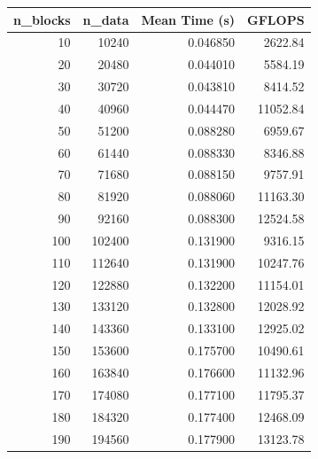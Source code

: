 \begin{table}[H]
    \centering
    \small
    \begin{tabular}{|r|r|r|r|}
        \hline
        n\_blocks    & n\_data         & Mean Time (s)     & GFLOPS            \\
        \hline
        10           & 10240           & 0.046850          & 2622.84           \\
        20           & 20480           & 0.044010          & 5584.19           \\
        30           & 30720           & 0.043810          & 8414.52           \\
        40           & 40960           & 0.044470          & 11052.84          \\
        50           & 51200           & 0.088280          & 6959.67           \\
        60           & 61440           & 0.088330          & 8346.88           \\
        70           & 71680           & 0.088150          & 9757.91           \\
        80           & 81920           & 0.088060          & 11163.30          \\
        90           & 92160           & 0.088300          & 12524.58          \\
        100          & 102400          & 0.131900          & 9316.15           \\
        110          & 112640          & 0.131900          & 10247.76          \\
        120          & 122880          & 0.132200          & 11154.01          \\
        130          & 133120          & 0.132800          & 12028.92          \\
        140          & 143360          & 0.133100          & 12925.02          \\
        150          & 153600          & 0.175700          & 10490.61          \\
        160          & 163840          & 0.176600          & 11132.96          \\
        170          & 174080          & 0.177100          & 11795.37          \\
        180          & 184320          & 0.177400          & 12468.09          \\
        190          & 194560          & 0.177900          & 13123.78          \\

\end{tabular}
\end{table}
